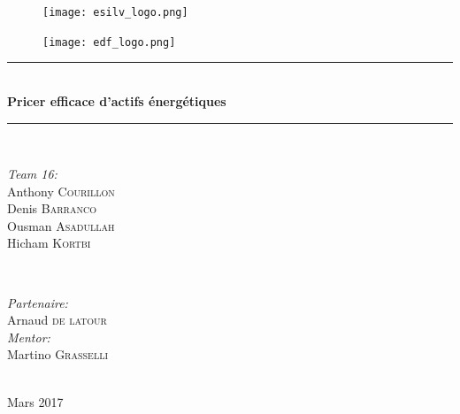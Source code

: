 \documentclass[12pt]{report}
\begin{document}
\begin{titlepage}

\newcommand{\HRule}{\rule{\linewidth}{0.5mm}} %

\begin{figure}
	\begin{minipage}[t]{.5\linewidth}
	\centering
	\texttt{[image: esilv\_logo.png]}\\[1cm]
	\end{minipage}
	\begin{minipage}[t]{.5\linewidth}
	\texttt{[image: edf\_logo.png]}\\[1cm]
	\end{minipage}
\end{figure}

\center %



\HRule \\[0.4cm]
{ \huge \bfseries Pricer efficace d'actifs énergétiques}\\[0.4cm] %
\HRule \\[1.5cm]


\begin{minipage}{0.4\textwidth}
	\begin{flushleft} \large
		\emph{Team 16:}\\
		Anthony \textsc{Courillon} %
		\\
		Denis \textsc{Barranco}
		\\
		Ousman \textsc{Asadullah}
		\\
		Hicham \textsc{Kortbi} %
	\end{flushleft}
\end{minipage}
~
\begin{minipage}{0.4\textwidth}
	\begin{flushright} \large
		\emph{Partenaire:} \\
		Arnaud \textsc{de latour} %
		\\
		\emph{Mentor:} \\
		Martino \textsc{Grasselli} %
	\end{flushright}
\end{minipage}\\[2cm]


{\large Mars 2017}\\[2cm] %

\end{titlepage}
\end{document}
